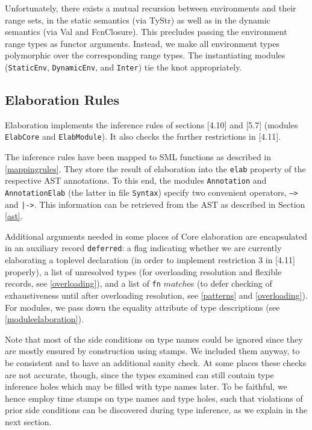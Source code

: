\documentclass[twoside,titlepage]{article}
\begin{document}
Unfortunately, there exists a mutual recursion between environments and their range sets, in the static semantics (via TyStr) as well as in the dynamic semantics (via Val and FcnClosure). This precludes passing the environment range types as functor arguments. Instead, we make all environment types polymorphic over the corresponding range types. The instantiating modules ({\tt{StaticEnv}}, {\tt DynamicEnv}, and {\tt Inter}) tie the knot appropriately.


\subsection{Elaboration Rules}
\label{elaborationrules}

Elaboration implements the inference rules of sections [4.10] and [5.7] (modules {\tt ElabCore} and {\tt ElabModule}). It also checks the further restrictions in [4.11].

The inference rules have been mapped to SML functions as described in \ref{mappingrules}. They store the result of elaboration into the {\tt elab} property of the respective AST annotations. To this end, the modules {\tt Annotation} and {\tt AnnotationElab} (the latter in file {\tt Syntax}) specify two convenient  operators, {\tt -->} and {\tt |->}. This information can be retrieved from the AST as described in Section \ref{ast}.

Additional arguments needed in some places of Core elaboration are encapsulated in an auxiliary record {\tt deferred}: a flag indicating whether we are currently elaborating a toplevel declaration (in order to implement restriction 3 in [4.11] properly), a list of unresolved types (for overloading resolution and flexible records, see \ref{overloading}), and a list of {\tt fn} $\mathit{match}$es (to defer checking of exhaustiveness until after overloading resolution, see \ref{patterns} and \ref{overloading}). For modules, we pass down the equality attribute of type descriptions (see \ref{moduleelaboration}).

Note that most of the side conditions on type names could be ignored since they are mostly ensured by construction using stamps. We included them anyway, to be consistent and to have an additional sanity check. At some places these checks are not accurate, though, since the types examined can still contain type inference holes which may be filled with type names later. To be faithful, we hence employ time stamps on type names and type holes, such that violations of prior side conditions can be discovered during type inference, as we explain in the next section.
\end{document}
